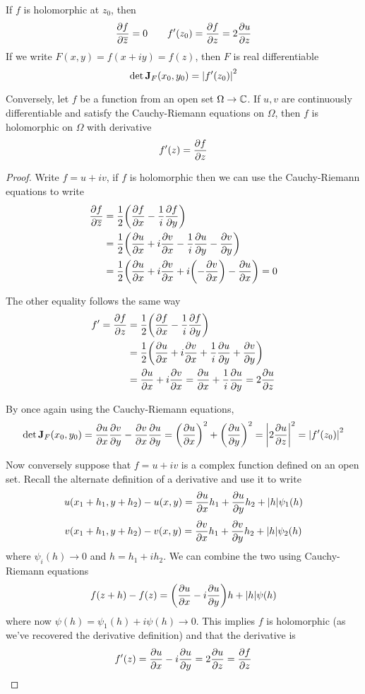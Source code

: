 \begin{theorem}
	If $f$ is holomorphic at $z_0$, then
	\[ \pdv{f}{\overline{z}}(z_0) = 0 \qquad f'(z_0) = \pdv{f}{z}(z_0) = 2\pdv{u}{z}(z_0) \]
	If we write $F(x, y) = f(x + iy) = f(z)$, then $F$ is real differentiable
	\[ \det \mathbf J_F(x_0, y_0) = \abs{f'(z_0)}^2\]
	
	Conversely, let $f$ be a function from an open set $\Omega \to \mathbb{C}$. If $u, v$ are continuously differentiable and satisfy the Cauchy-Riemann equations on $\Omega$, then $f$ is holomorphic on $\Omega$ with derivative
	\[ f'(z) = \pdv{f}{z} \]
\end{theorem}
\begin{proof}
	Write $f = u + iv$, if $f$ is holomorphic then we can use the Cauchy-Riemann equations to write
	\begin{align*}
		\pdv{f}{\overline{z}} &= \frac{1}{2} \qty( \pdv{f}{x} - \frac{1}{i} \pdv{f}{y} ) \\
		&= \frac{1}{2} \qty( \pdv{u}{x} + i \pdv{v}{x} - \frac{1}{i} \pdv{u}{y} - \pdv{v}{y} ) \\
		&= \frac{1}{2} \qty( \pdv{u}{x} + i \pdv{v}{x} + i\qty(-\pdv{v}{x}) - \pdv{u}{x} ) = 0
	\end{align*}
	
	The other equality follows the same way
	\begin{align*}
	 f' = \pdv{f}{z} &= \frac{1}{2} \qty( \pdv{f}{x} - \frac{1}{i} \pdv{f}{y} ) \\
	 &= \frac{1}{2} \qty( \pdv{u}{x} + i \pdv{v}{x} + \frac{1}{i} \pdv{u}{y} + \pdv{v}{y} ) \\
	 &= \pdv{u}{x} + i \pdv{v}{x} = \pdv{u}{x} + \frac{1}{i} \pdv{u}{y} = 2 \pdv{u}{z}
	\end{align*}
	
	By once again using the Cauchy-Riemann equations,
	\[ \det \mathbf J_F(x_0, y_0) = \pdv{u}{x} \pdv{v}{y} - \pdv{v}{x} \pdv{u}{y} = \qty(\pdv{u}{x})^2 + \qty(\pdv{u}{y})^2 = \abs{2\pdv{u}{z}}^2 = \abs{f'(z_0)}^2 \]
	
	Now conversely suppose that $f = u + iv$ is a complex function defined on an open set. Recall the alternate definition of a derivative and use it to write
	\[ u(x_1 + h_1, y + h_2) - u(x, y) = \pdv{u}{x} h_1 + \pdv{u}{y} h_2 + |h|\psi_1(h) \]
	\[ v(x_1 + h_1, y + h_2) - v(x, y) = \pdv{v}{x} h_1 + \pdv{v}{y} h_2 + |h|\psi_2(h) \]
	where $\psi_i(h) \to 0$ and $h = h_1 + ih_2$. We can combine the two using Cauchy-Riemann equations
	\[ f(z + h) - f(z) = \qty(\pdv{u}{x} - i \pdv{u}{y}) h + |h| \psi(h) \]
	where now $\psi(h) = \psi_1(h) + i\psi(h) \to 0$. This implies $f$ is holomorphic (as we've recovered the derivative definition) and that the derivative is
	\[ f'(z) = \pdv{u}{x} - i \pdv{u}{y} = 2\pdv{u}{z} = \pdv{f}{z} \]
\end{proof}

